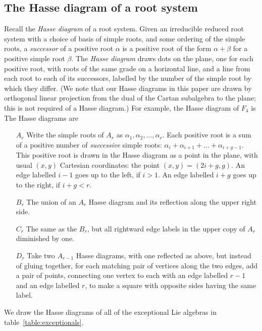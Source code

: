 \documentclass[a4paper,10pt]{amsart}
\theoremstyle{remark}
\begin{document}
\subsection{The Hasse diagram of a root system}
Recall the \emph{Hasse diagram} of a root system.
Given an irreducible reduced root system with a choice of basis of simple roots, and some ordering of the simple roots, a \emph{successor} of a positive root \(\alpha\) is a positive root of the form \(\alpha+\beta\) for a positive simple root \(\beta\).
The \emph{Hasse diagram} draws dots on the plane, one for each positive root, with roots of the same grade on a horizontal line, and a line from each root to each of its successors, labelled by the number of the simple root by which they differ.
(We note that our Hasse diagrams in this paper are drawn by orthogonal linear projection from the dual of the Cartan subalgebra to the plane; this is not required of a Hasse diagram.)
For example, the Hasse diagram of \(F_4\) is
\tikzset{/Lie Hasse diagram,attach Dynkin diagram=true,three D=true}
The Hasse diagrams are
\begin{enumerate}
\item[\(A_r\)] Write the simple roots of \(A_r\) as \(\alpha_1,\alpha_2,\dots,\alpha_r\).
Each positive root is a sum of a positive number of \emph{successive} simple roots: \(\alpha_i+\alpha_{i+1}+\dots+\alpha_{i+g-1}\).
This positive root is drawn in the Hasse diagram as a point in the plane, with usual \((x,y)\) Cartesian coordinates: the point \((x,y)=(2i+g,g)\). 
An edge labelled \(i-1\) goes up to the left, if \(i>1\).
An edge labelled \(i+g\) goes up to the right, if \(i+g<r\).
\item[\(B_r\)] The union of an \(A_r\) Hasse diagram and its reflection along the upper right side.
\item[\(C_r\)] The same as the \(B_r\), but all rightward edge labels in the upper copy of \(A_r\) diminished by one.
\item[\(D_r\)] 
Take two \(A_{r-1}\) Hasse diagrams, with one reflected as above, but instead of gluing together, for each matching pair of vertices along the two edges, add a pair of points, connecting one vertex to each with an edge labelled \(r-1\) and an edge labelled \(r\), to make a square with opposite sides having the same label.
\end{enumerate}
We draw the Hasse diagrams of all of the exceptional Lie algebras in table~\vref{table:exceptionals}.
\end{document}
